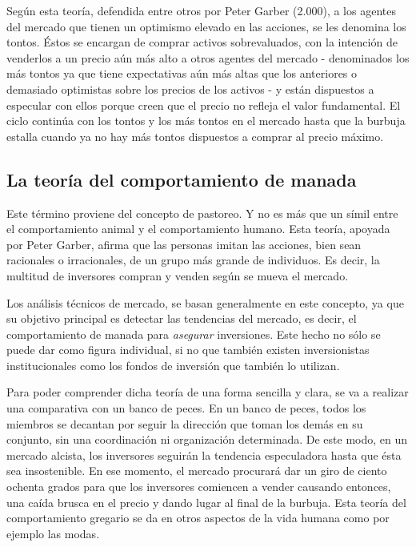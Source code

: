 Según esta teoría, defendida entre otros por Peter Garber (2.000), a los agentes del mercado que tienen un optimismo elevado en las acciones, se les denomina los tontos. Éstos se encargan de comprar activos sobrevaluados, con la intención de venderlos a un precio aún más alto a otros agentes del mercado - denominados los más tontos ya que tiene expectativas aún más altas que los anteriores o demasiado optimistas sobre los precios de los activos - y están dispuestos a especular con ellos porque creen que el precio no refleja el valor fundamental. El ciclo continúa con los tontos y los más tontos en el mercado hasta que la burbuja estalla cuando ya no hay más tontos dispuestos a comprar al precio máximo. 

\subsection{La teoría del comportamiento de manada} 

Este término proviene del concepto de pastoreo. Y no es más que un símil entre el comportamiento animal y el comportamiento humano. Esta teoría, apoyada por Peter Garber, afirma que las personas imitan las acciones, bien sean racionales o irracionales, de un grupo más grande de individuos. Es decir, la multitud de inversores compran y venden según se mueva el mercado.

Los análisis técnicos de mercado, se basan generalmente en este concepto, ya que su objetivo principal es detectar las tendencias del mercado, es decir, el comportamiento de manada para \emph{asegurar} inversiones. Este hecho no sólo se puede dar como figura individual, si no que también existen inversionistas institucionales como los fondos de inversión que también lo utilizan.

Para poder comprender dicha teoría de una forma sencilla y clara, se va a realizar una comparativa con un banco de peces. En un banco de peces, todos los miembros se decantan por seguir la dirección que toman los demás en su conjunto, sin una coordinación ni organización determinada. De este modo, en un mercado alcista, los inversores seguirán la tendencia especuladora hasta que ésta sea insostenible. En ese momento, el mercado procurará dar un giro de ciento ochenta grados para que los inversores comiencen a vender causando entonces, una caída brusca en el precio y dando lugar al final de la burbuja. Esta teoría del comportamiento gregario se da en otros aspectos de la vida humana como por ejemplo las modas. 

